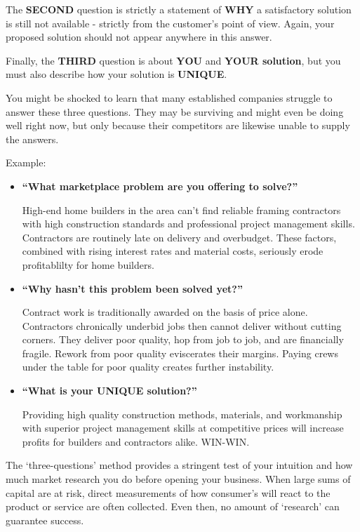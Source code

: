 \documentclass[
]{book}
\begin{document}
The \textbf{SECOND} question is strictly a statement of \textbf{WHY} a satisfactory solution is still not available - strictly from the customer's point of view. Again, your proposed solution should not appear anywhere in this answer.

Finally, the \textbf{THIRD} question is about \textbf{YOU} and \textbf{YOUR solution}, but you must also describe how your solution is \textbf{UNIQUE}.

You might be shocked to learn that many established companies struggle to answer these three questions. They may be surviving and might even be doing well right now, but only because their competitors are likewise unable to supply the answers.

Example:

\begin{itemize}
\item
  \textbf{``What marketplace problem are you offering to solve?''}

  High-end home builders in the area can't find reliable framing contractors with high construction standards and professional project management skills. Contractors are routinely late on delivery and overbudget. These factors, combined with rising interest rates and material costs, seriously erode profitablilty for home builders.
\item
  \textbf{``Why hasn't this problem been solved yet?''}

  Contract work is traditionally awarded on the basis of price alone. Contractors chronically underbid jobs then cannot deliver without cutting corners. They deliver poor quality, hop from job to job, and are financially fragile. Rework from poor quality eviscerates their margins. Paying crews under the table for poor quality creates further instability.
\item
  \textbf{``What is your UNIQUE solution?''}

  Providing high quality construction methods, materials, and workmanship with superior project management skills at competitive prices will increase profits for builders and contractors alike. WIN-WIN.
\end{itemize}

The `three-questions' method provides a stringent test of your intuition and how much market research you do before opening your business. When large sums of capital are at risk, direct measurements of how consumer's will react to the product or service are often collected. Even then, no amount of `research' can guarantee success.
\end{document}
